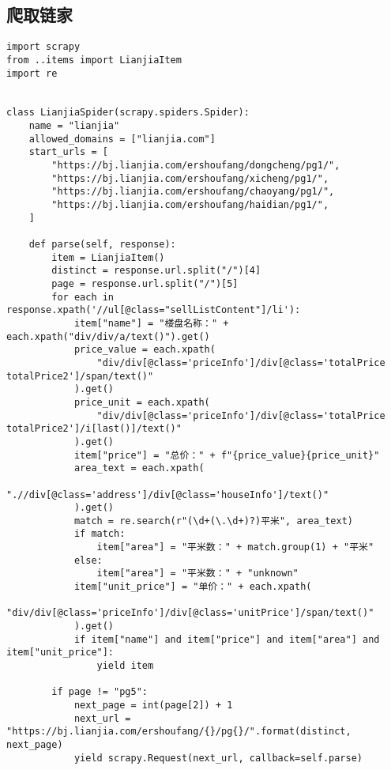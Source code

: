 \documentclass[lang=cn,11pt,a4paper]{elegantpaper}
\begin{document}
\subsection{爬取链家}

\begin{lstlisting}
import scrapy
from ..items import LianjiaItem
import re


class LianjiaSpider(scrapy.spiders.Spider):
    name = "lianjia"
    allowed_domains = ["lianjia.com"]
    start_urls = [
        "https://bj.lianjia.com/ershoufang/dongcheng/pg1/",
        "https://bj.lianjia.com/ershoufang/xicheng/pg1/",
        "https://bj.lianjia.com/ershoufang/chaoyang/pg1/",
        "https://bj.lianjia.com/ershoufang/haidian/pg1/",
    ]

    def parse(self, response):
        item = LianjiaItem()
        distinct = response.url.split("/")[4]
        page = response.url.split("/")[5]
        for each in response.xpath('//ul[@class="sellListContent"]/li'):
            item["name"] = "楼盘名称：" + each.xpath("div/div/a/text()").get()
            price_value = each.xpath(
                "div/div[@class='priceInfo']/div[@class='totalPrice totalPrice2']/span/text()"
            ).get()
            price_unit = each.xpath(
                "div/div[@class='priceInfo']/div[@class='totalPrice totalPrice2']/i[last()]/text()"
            ).get()
            item["price"] = "总价：" + f"{price_value}{price_unit}"
            area_text = each.xpath(
                ".//div[@class='address']/div[@class='houseInfo']/text()"
            ).get()
            match = re.search(r"(\d+(\.\d+)?)平米", area_text)
            if match:
                item["area"] = "平米数：" + match.group(1) + "平米"
            else:
                item["area"] = "平米数：" + "unknown"
            item["unit_price"] = "单价：" + each.xpath(
                "div/div[@class='priceInfo']/div[@class='unitPrice']/span/text()"
            ).get()
            if item["name"] and item["price"] and item["area"] and item["unit_price"]:
                yield item

        if page != "pg5":
            next_page = int(page[2]) + 1
            next_url = "https://bj.lianjia.com/ershoufang/{}/pg{}/".format(distinct, next_page)
            yield scrapy.Request(next_url, callback=self.parse)

\end{lstlisting}

\end{document}
